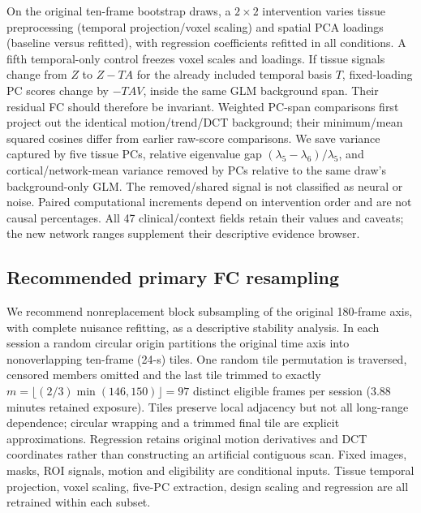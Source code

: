 \documentclass[11pt,a4paper]{article}
\begin{document}
On the original ten-frame bootstrap draws, a $2\times2$ intervention varies tissue preprocessing (temporal projection/voxel scaling) and spatial PCA loadings (baseline versus refitted), with regression coefficients refitted in all conditions. A fifth temporal-only control freezes voxel scales and loadings. If tissue signals change from $Z$ to $Z-TA$ for the already included temporal basis $T$, fixed-loading PC scores change by $-TAV$, inside the same GLM background span. Their residual FC should therefore be invariant. Weighted PC-span comparisons first project out the identical motion/trend/DCT background; their minimum/mean squared cosines differ from earlier raw-score comparisons. We save variance captured by five tissue PCs, relative eigenvalue gap $(\lambda_5-\lambda_6)/\lambda_5$, and cortical/network-mean variance removed by PCs relative to the same draw's background-only GLM. The removed/shared signal is not classified as neural or noise. Paired computational increments depend on intervention order and are not causal percentages. All 47 clinical/context fields retain their values and caveats; the new network ranges supplement their descriptive evidence browser.

\subsection{Recommended primary FC resampling}\label{sec:primaryfcmethods}
We recommend nonreplacement block subsampling of the original 180-frame axis, with complete nuisance refitting, as a descriptive stability analysis. In each session a random circular origin partitions the original time axis into nonoverlapping ten-frame (24-s) tiles. One random tile permutation is traversed, censored members omitted and the last tile trimmed to exactly $m=\lfloor (2/3)\min(146,150)\rfloor=97$ distinct eligible frames per session (3.88 minutes retained exposure). Tiles preserve local adjacency but not all long-range dependence; circular wrapping and a trimmed final tile are explicit approximations. Regression retains original motion derivatives and DCT coordinates rather than constructing an artificial contiguous scan. Fixed images, masks, ROI signals, motion and eligibility are conditional inputs. Tissue temporal projection, voxel scaling, five-PC extraction, design scaling and regression are all retrained within each subset.
\end{document}
